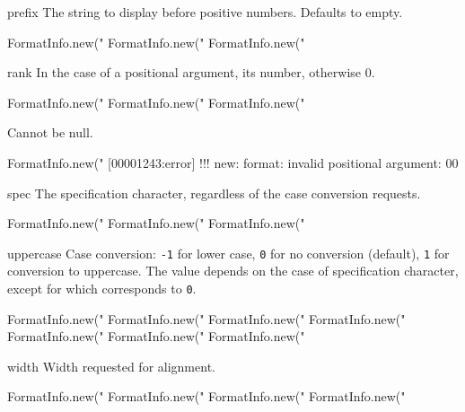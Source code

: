 \begin{urbiscriptapi}
\item[prefix]
  The string to display before positive numbers.  Defaults to empty.
\begin{urbiassert}
FormatInfo.new("%
FormatInfo.new("%
FormatInfo.new("%
\end{urbiassert}


\item[rank]%
  In the case of a positional argument, its number, otherwise 0.
\begin{urbiassert}
FormatInfo.new("%
FormatInfo.new("%
FormatInfo.new("%
\end{urbiassert}
Cannot be null.
\begin{urbiscript}
FormatInfo.new("%
[00001243:error] !!! new: format: invalid positional argument: 00
\end{urbiscript}

\item[spec]
  The specification character, regardless of the case conversion
  requests.
\begin{urbiassert}
FormatInfo.new("%
FormatInfo.new("%
FormatInfo.new("%
\end{urbiassert}


\item[uppercase]
  Case conversion: \lstinline|-1| for lower case, \lstinline|0| for no
  conversion (default), \lstinline|1| for conversion to uppercase.
  The value depends on the case of specification character, except for
   which corresponds to \lstinline|0|.
\begin{urbiassert}
FormatInfo.new("%
FormatInfo.new("%
FormatInfo.new("%
FormatInfo.new("%
FormatInfo.new("%
FormatInfo.new("%
FormatInfo.new("%
\end{urbiassert}


\item[width]
  Width requested for alignment.
\begin{urbiassert}
FormatInfo.new("%
FormatInfo.new("%
FormatInfo.new("%
FormatInfo.new("%
\end{urbiassert}
\end{urbiscriptapi}

